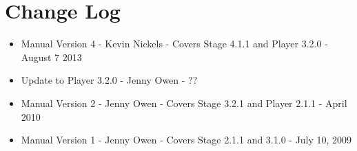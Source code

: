 \documentclass[a4paper]{report}
\begin{document}
\chapter{Change Log}
\begin{itemize}
\item Manual Version 4 - Kevin Nickels - Covers Stage 4.1.1 and Player 
3.2.0 - August 7 2013
\item Update to Player 3.2.0 - Jenny Owen - ??
\item Manual Version 2 - Jenny Owen - Covers Stage 3.2.1 and Player 2.1.1
- April 2010
\item Manual Version 1 - Jenny Owen - Covers Stage 2.1.1 and 3.1.0 - July 10, 2009
\end{itemize}
\end{document}
